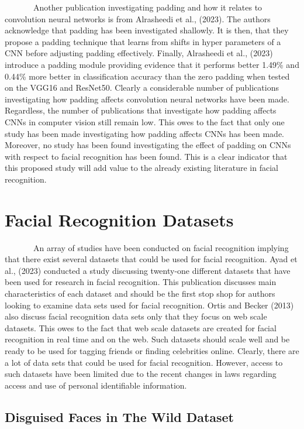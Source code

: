 \documentclass[
  12pt,
]{report}
\begin{document}
~~~~~~~Another publication investigating padding and how it relates to
convolution neural networks is from Alrasheedi et al., (2023). The
authors acknowledge that padding has been investigated shallowly. It is
then, that they propose a padding technique that learns from shifts in
hyper parameters of a CNN before adjusting padding effectively. Finally,
Alrasheedi et al., (2023) introduce a padding module providing evidence
that it performs better 1.49\% and 0.44\% more better in classification
accuracy than the zero padding when tested on the VGG16 and ResNet50.
Clearly a considerable number of publications investigating how padding
affects convolution neural networks have been made. Regardless, the
number of publications that investigate how padding affects CNNs in
computer vision still remain low. This owes to the fact that only one
study has been made investigating how padding affects CNNs has been
made. Moreover, no study has been found investigating the effect of
padding on CNNs with respect to facial recognition has been found. This
is a clear indicator that this proposed study will add value to the
already existing literature in facial recognition.

\section{Facial Recognition Datasets}\label{facial-recognition-datasets}

~~~~~~~An array of studies have been conducted on facial recognition
implying that there exist several datasets that could be used for facial
recognition. Ayad et al., (2023) conducted a study discussing twenty-one
different datasets that have been used for research in facial
recognition. This publication discusses main characteristics of each
dataset and should be the first stop shop for authors looking to examine
data sets used for facial recognition. Ortis and Becker (2013) also
discuss facial recognition data sets only that they focus on web scale
datasets. This owes to the fact that web scale datasets are created for
facial recognition in real time and on the web. Such datasets should
scale well and be ready to be used for tagging friends or finding
celebrities online. Clearly, there are a lot of data sets that could be
used for facial recognition. However, access to such datasets have been
limited due to the recent changes in laws regarding access and use of
personal identifiable information.

\subsection{Disguised Faces in The Wild
Dataset}\label{disguised-faces-in-the-wild-dataset}
\end{document}

